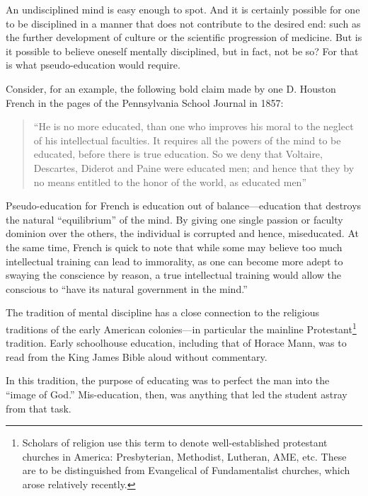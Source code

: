 An undisciplined mind is easy enough to spot. And it is certainly possible for one to be disciplined in a manner that does not contribute to the desired end: such as the further development of culture or the scientific progression of medicine. But is it possible to believe oneself mentally disciplined, but in fact, not be so? For that is what pseudo-education would require.

Consider, for an example, the following bold claim made by one D. Houston French in the pages of the Pennsylvania School Journal in 1857:

\begin{quote}

``He is no more educated, than one who improves his moral to the neglect of his intellectual faculties. It requires all the powers of the mind to be educated, before there is true education. So we deny that Voltaire, Descartes, Diderot and Paine were educated men; and hence that they by no means entitled to the honor of the world, as educated men'' ~\citep{French:1857to}
\end{quote}

Pseudo-education for French is education out of balance---education that destroys the natural ``equilibrium'' of the mind. By giving one single passion or faculty dominion over the others, the individual is corrupted and hence, miseducated. At the same time, French is quick to note that while some may believe too much intellectual training can lead to immorality, as one can become more adept to swaying the conscience by reason, a true intellectual training would allow the conscious to ``have its natural government in the mind.''

The tradition of mental discipline has a close connection to the religious traditions of the early American colonies---in particular the mainline Protestant\footnote{Scholars of religion use this term to denote well-established protestant churches in America: Presbyterian, Methodist, Lutheran, AME, etc. These are to be distinguished from Evangelical of Fundamentalist churches, which arose relatively recently.} tradition. Early schoolhouse education, including that of Horace Mann, was to read from the King James Bible aloud without commentary.

In this tradition, the purpose of educating was to perfect the man into the ``image of God.'' Mis-education, then, was anything that led the student astray from that task.

